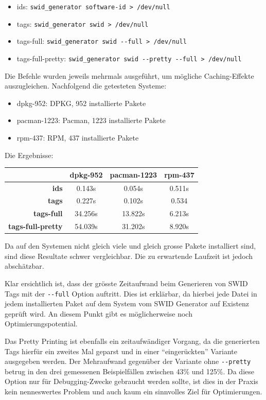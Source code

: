 \begin{itemize}
	\item ids: \texttt{swid\_generator software-id > /dev/null}
	\item tags: \texttt{swid\_generator swid > /dev/null}
	\item tags-full: \texttt{swid\_generator swid -{}-full > /dev/null}
	\item tags-full-pretty: \texttt{swid\_generator swid -{}-pretty -{}-full > /dev/null}
\end{itemize}

Die Befehle wurden jeweils mehrmals ausgeführt, um mögliche Caching-Effekte
auszugleichen. Nachfolgend die getesteten Systeme:

\begin{itemize}
	\item dpkg-952: DPKG, 952 installierte Pakete
	\item pacman-1223: Pacman, 1223 installierte Pakete
	\item rpm-437: RPM, 437 installierte Pakete
\end{itemize}

Die Ergebnisse:

\begin{tabularx}{\textwidth}{rCCC}
	& \textbf{dpkg-952} & \textbf{pacman-1223} & \textbf{rpm-437} \\
	\hline
	\textbf{ids} & 0.143s & 0.054s & 0.511s \\
	\hline
	\textbf{tags} & 0.227s & 0.102s & 0.534\\
	\hline
	\textbf{tags-full} & 34.256s & 13.822s & 6.213s \\
	\hline
	\textbf{tags-full-pretty} & 54.039s & 31.202s & 8.920s \\
	\hline
\end{tabularx}

\vspace{1.5em}

Da auf den Systemen nicht gleich viele und gleich grosse Pakete installiert
sind, sind diese Resultate schwer vergleichbar. Die zu erwartende Laufzeit ist jedoch abschätzbar.

Klar ersichtlich ist, dass der grösste Zeitaufwand beim Generieren von SWID Tags
mit der \texttt{-{}-full} Option auftritt. Dies ist erklärbar, da hierbei jede
Datei in jedem installierten Paket auf dem System vom SWID Generator auf
Existenz geprüft wird. An diesem Punkt gibt es möglicherweise noch
Optimierungspotential.

Das Pretty Printing ist ebenfalls ein zeitaufwändiger Vorgang, da die
generierten Tags hierfür ein zweites Mal geparst und in einer
\enquote{eingerückten} Variante ausgegeben werden. Der Mehraufwand gegenüber
der Variante ohne \texttt{-{}-pretty} betrug in den drei gemessenen
Beispielfällen zwischen 43\% und 125\%. Da diese Option nur für Debugging-Zwecke
gebraucht werden sollte, ist dies in der Praxis kein nenneswertes Problem und
auch kaum ein sinnvolles Ziel für Optimierungen.


